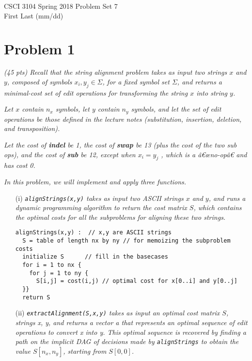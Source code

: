 \documentclass[11pt]{article} \setlength{\oddsidemargin}{0in}
\begin{document}
\noindent CSCI 3104 Spring 2018 \hfill Problem Set 7\\
First Last (mm/dd)

\hrulefill

{\selectfont

  \section*{Problem 1}

  \textit{(45 pts) Recall that the string alignment problem takes as
    input two strings $x$ and $y$, composed of symbols
    $x_i , y_j \in \Sigma$, for a fixed symbol set $\Sigma$, and returns a
    minimal-cost set of edit operations for transforming the string
    $x$ into string $y$.}

  \textit{Let $x$ contain $n_x$ symbols, let $y$ contain $n_y$
    symbols, and let the set of edit operations be those defined in
    the lecture notes (substitution, insertion, deletion, and
    transposition).}

  \textit{Let the cost of \textbf{indel} be 1, the cost of
    \textbf{swap} be 13 (plus the cost of the two sub ops), and the
    cost of \textbf{sub} be 12, except when $x_i = y_j$ , which is a
    â€œno-opâ€ and has cost 0.}

  \textit{In this problem, we will implement and apply three
    functions.}

  \begin{enumerate}
  \item[(i)] \textit{ \texttt{alignStrings(x,y)} takes as input two
      ASCII strings $x$ and $y$, and runs a dynamic programming
      algorithm to return the cost matrix $S$, which contains the
      optimal costs for all the subproblems for aligning these two
      strings.  }

\begin{verbatim}
alignStrings(x,y) :  // x,y are ASCII strings
  S = table of length nx by ny // for memoizing the subproblem costs
  initialize S      // fill in the basecases
  for i = 1 to nx {
    for j = 1 to ny {
      S[i,j] = cost(i,j) // optimal cost for x[0..i] and y[0..j]
  }}
  return S
\end{verbatim}

  \item[(ii)] \textit{\texttt{extractAlignment(S,x,y)} takes as input
      an optimal cost matrix $S$, strings x, y, and returns a vector a
      that represents an optimal sequence of edit operations to
      convert x into y. This optimal sequence is recovered by finding
      a path on the implicit DAG of decisions made by
      \texttt{alignStrings} to obtain the value $S[n_x , n_y]$,
      starting from $S[0, 0]$.}


\end{enumerate}}
\end{document}
